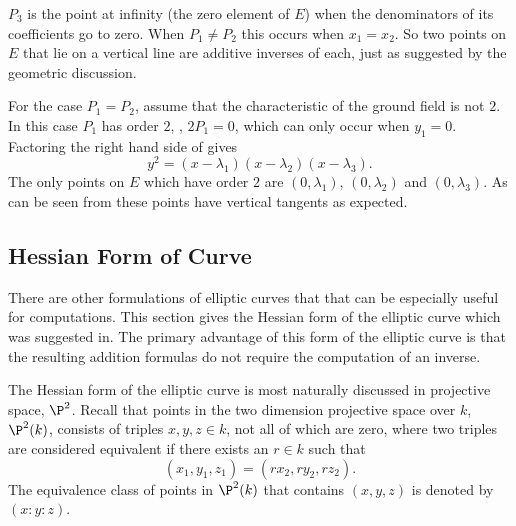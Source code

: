 $P_3$ is the point at infinity (the zero element of $E$) when the
denominators of its coefficients go to zero.  When $P_1 \not= P_2$
this occurs when $x_1 = x_2$.  So two points on $E$ that lie on a
vertical line are additive inverses of each, just as suggested by the
geometric discussion.   

For the case $P_1 = P_2$, assume that the characteristic of the ground
field is not $2$.  In this case $P_1$ has order $2$, \ie, $2P_1 = 0$,
which can only occur when $y_1 = 0$.  Factoring the right hand side of
 gives
\[
y^2 = (x - \lambda_1) (x - \lambda_2) (x - \lambda_3).
\]
The only points on $E$ which have order $2$ are $(0, \lambda_1)$, $(0,
\lambda_2)$ and $(0, \lambda_3)$.  As can be seen from
 these points have vertical tangents as
expected.

\subsection{Hessian Form of Curve}
\label{Elliptic:Hessian:Add:Sec}

There are other formulations of elliptic curves that that can be
especially useful for computations.  This section gives the Hessian
form of the elliptic curve which was suggested in\cite{Chudnovsky85}.
The primary advantage of this form of the elliptic curve is that the
resulting addition formulas do not require the computation of an
inverse.

The Hessian form of the elliptic curve is most naturally discussed in
projective space, $\P^2$.  Recall that points
in the two dimension projective space over $k$, $\P^2(k)$, consists of
triples $x,y,z \in k$, not all of which are zero, where two triples
are considered equivalent if there exists an $r \in k$ such that
\[
(x_1, y_1, z_1) = (r x_2, r y_2, r z_2).
\]
The equivalence class of points in $\P^2(k)$ that contains $(x, y, z)$
is denoted by $(x:y:z)$.

